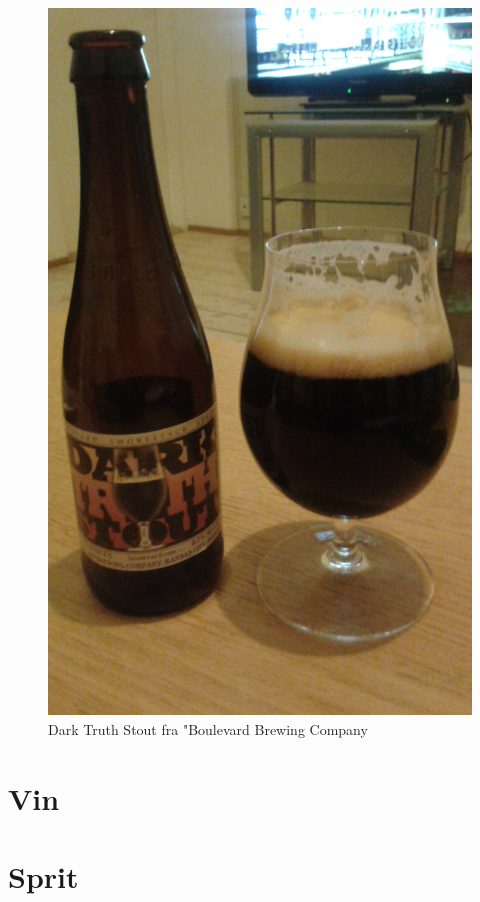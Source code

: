 \documentclass[12pt,a4paper,oneside,norsk]{article}
\begin{document}
\begin{figure} [H]
\centering
\includegraphics[scale=0.1, angle=270]{Bilder/Ol/darktruthstout}
\caption{Dark Truth Stout fra "Boulevard Brewing Company}
\end{figure}

\newpage
\section{Vin}

\newpage
\section{Sprit}
\end{document}
